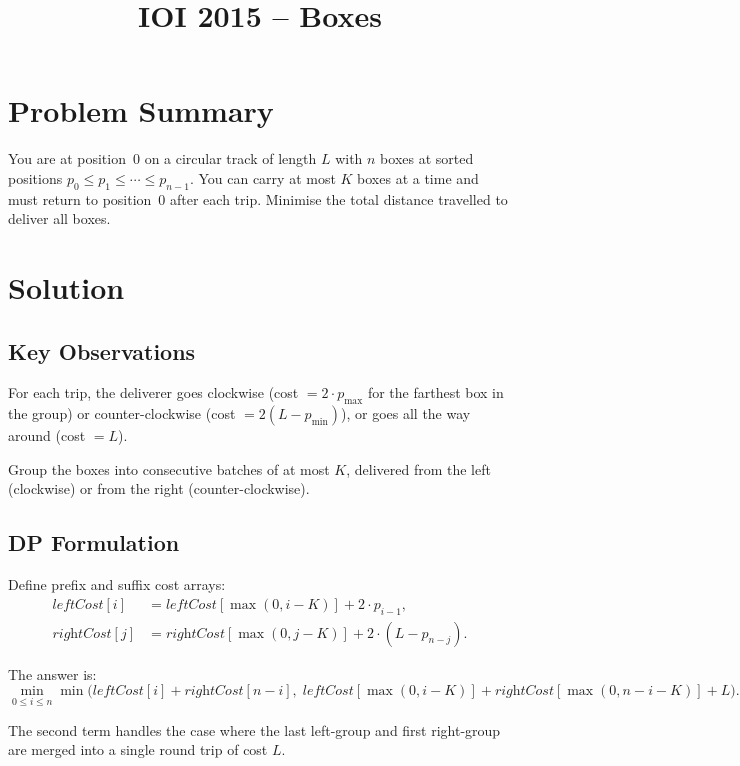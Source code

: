 \documentclass[11pt,a4paper]{article}
\title{IOI 2015 -- Boxes}
\author{}
\date{}
\begin{document}
\maketitle

\section{Problem Summary}

You are at position~0 on a circular track of length $L$ with $n$ boxes at sorted positions $p_0 \le p_1 \le \cdots \le p_{n-1}$. You can carry at most $K$ boxes at a time and must return to position~0 after each trip. Minimise the total distance travelled to deliver all boxes.

\section{Solution}

\subsection{Key Observations}

For each trip, the deliverer goes clockwise (cost $= 2 \cdot p_{\max}$ for the farthest box in the group) or counter-clockwise (cost $= 2(L - p_{\min})$), or goes all the way around (cost $= L$).

Group the boxes into consecutive batches of at most $K$, delivered from the left (clockwise) or from the right (counter-clockwise).

\subsection{DP Formulation}

Define prefix and suffix cost arrays:
\begin{align*}
  \textit{leftCost}[i] &= \textit{leftCost}[\max(0, i-K)] + 2 \cdot p_{i-1}, \\
  \textit{rightCost}[j] &= \textit{rightCost}[\max(0, j-K)] + 2 \cdot (L - p_{n-j}).
\end{align*}

The answer is:
\[
  \min_{0 \le i \le n} \min\!\big(\textit{leftCost}[i] + \textit{rightCost}[n-i],\;
  \textit{leftCost}[\max(0,i-K)] + \textit{rightCost}[\max(0,n-i-K)] + L\big).
\]

The second term handles the case where the last left-group and first right-group are merged into a single round trip of cost $L$.
\end{document}
